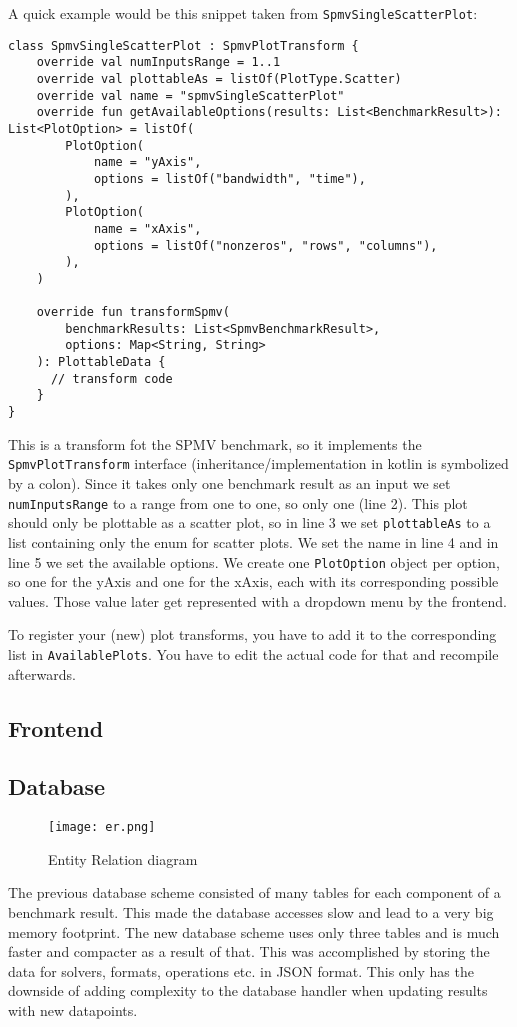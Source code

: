 A quick example would be this snippet taken from \texttt{SpmvSingleScatterPlot}:

\begin{lstlisting}
class SpmvSingleScatterPlot : SpmvPlotTransform {
    override val numInputsRange = 1..1
    override val plottableAs = listOf(PlotType.Scatter)
    override val name = "spmvSingleScatterPlot"
    override fun getAvailableOptions(results: List<BenchmarkResult>): List<PlotOption> = listOf(
        PlotOption(
            name = "yAxis",
            options = listOf("bandwidth", "time"),
        ),
        PlotOption(
            name = "xAxis",
            options = listOf("nonzeros", "rows", "columns"),
        ),
    )

    override fun transformSpmv(
        benchmarkResults: List<SpmvBenchmarkResult>,
        options: Map<String, String>
    ): PlottableData {
      // transform code
    }
}
\end{lstlisting}

This is a transform fot the SPMV benchmark, so it implements the \texttt{SpmvPlotTransform} interface (inheritance/implementation in kotlin is symbolized by a colon). Since it takes only one benchmark result as an input we set \texttt{numInputsRange} to a range from one to one, so only one (line 2). This plot should only be plottable as a scatter plot, so in line 3 we set \texttt{plottableAs} to a list containing only the enum for scatter plots. We set the name in line 4 and in line 5 we set the available options. We create one \texttt{PlotOption} object per option, so one for the yAxis and one for the xAxis, each with its corresponding possible values. Those value later get represented with a dropdown menu by the frontend.

To register your (new) plot transforms, you have to add it to the corresponding list in \texttt{AvailablePlots}. You have to edit the actual code for that and recompile afterwards.

\subsection{Frontend}

\subsection{Database}  

\begin{figure}[H]
	\centering
	\texttt{[image: er.png]}
	\caption{Entity Relation diagram}
  \label{fig:er}
\end{figure}

The previous database scheme consisted of many tables for each component of a benchmark result. This made the database accesses slow and lead to a very big memory footprint. The new database scheme uses only three tables and is much faster and compacter as a result of that. This was accomplished by storing the data for solvers, formats, operations etc. in JSON format. This only has the downside of adding complexity to the database handler when updating results with new datapoints.
